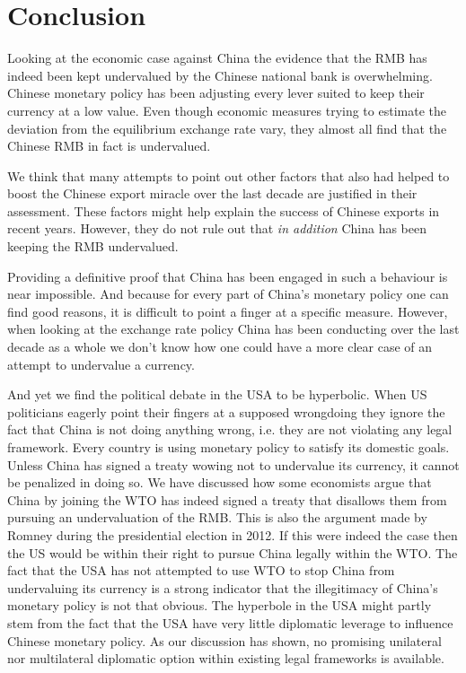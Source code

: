 \section{Conclusion}
\label{sec:conclusion}

Looking at the economic case against China the evidence that the RMB has 
indeed been kept undervalued by the Chinese national bank is 
overwhelming. Chinese monetary policy has been adjusting every lever suited to keep their currency at a low value.  Even though 
economic measures trying to estimate the deviation from the equilibrium exchange rate vary, they almost 
all find that the Chinese RMB in fact is undervalued.

We think that many attempts to point out other factors that also had helped to boost the Chinese 
export miracle over the last decade are justified in their 
assessment. These factors might help explain the success of 
Chinese exports in recent years. However, they do not rule out that \emph{in addition} China has been keeping the RMB undervalued.

Providing a definitive proof that China has been engaged in such a 
behaviour is near impossible. And because for every part of China's monetary policy one can find good reasons, it is difficult to point a finger at a specific measure. However, when looking at the exchange rate policy 
China has been conducting over the last decade as a whole we don't know 
how one could have a more clear case of an attempt to undervalue a currency.

And yet we find the political debate in the USA to be hyperbolic. When 
US politicians eagerly point their fingers at a supposed 
wrongdoing they ignore the fact that China is not doing anything wrong, i.e. they are not violating any legal framework.
Every country is using monetary policy to satisfy its domestic goals. Unless China has signed a treaty wowing not to undervalue its 
currency, it cannot be penalized in doing so. We have discussed how some economists argue that China by joining the 
WTO has indeed signed a treaty that disallows them from pursuing an 
undervaluation of the RMB. This is also the argument made by Romney 
during the presidential election in 2012. If this were indeed the case 
then the US would be within their right to pursue China legally within 
the WTO. The fact that the USA has not attempted to use WTO to stop China 
from undervaluing its currency is a strong indicator that the illegitimacy of China's monetary policy is not that obvious. The hyperbole in the USA might partly stem from the fact that the USA 
have very little diplomatic leverage to influence Chinese monetary 
policy. As our discussion has shown, no promising unilateral nor multilateral diplomatic option within existing legal frameworks is available. 

